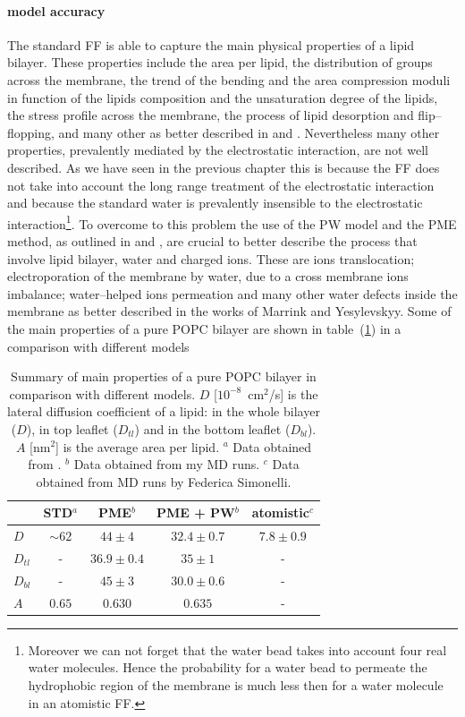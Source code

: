 \paragraph{\textbf{model accuracy}} The standard \martini \ac{FF} is able to capture the main physical properties 
of a lipid bilayer. These properties include the area per lipid, the distribution of groups across the membrane, 
the trend of the bending and the area compression moduli in function of the lipids composition and the 
unsaturation degree of the lipids, the stress profile across the membrane, the process of lipid desorption and 
flip--flopping, and many other as better described in \cite{Martini} and \cite{MartiniReview}. Nevertheless many 
other properties, prevalently mediated by the electrostatic interaction, are not well described. As we have seen 
in the previous chapter this is because the \martini \ac{FF} does not take into account the long range treatment 
of the electrostatic interaction and because the standard \martini water is prevalently insensible to the 
electrostatic interaction\footnote{Moreover we can not forget that the \martini water bead takes into account 
four real water molecules. Hence the probability for a \martini water bead to permeate the hydrophobic region of 
the membrane is much less then for a water molecule in an atomistic \ac{FF}.}. To overcome to this problem the 
use of the \ac{PW} model and the \ac{PME} method, as outlined in \cite{MartiniReview} and \cite{PW}, are crucial 
to better describe the process that involve lipid bilayer, water and charged ions. These are ions translocation; 
electroporation of the membrane by water, due to a cross membrane ions imbalance; water--helped ions permeation 
and many other water defects inside the membrane as better described in the works of Marrink and Yesylevskyy. Some of the main properties of a pure \ac{POPC} bilayer are shown in table~(\ref{tab:POPCData}) in a comparison with different models
\begin{table}[h!t]
	\centering
	\begin{tabular}{lcccc}
		\toprule
		\,				& STD$^a$	& \acs{PME}$^b$	& \acs{PME} + \acs{PW}$^b$ & atomistic$^c$ 	\\ \toprule
		$D$				& $\sim62$	& $44 \pm 4$	& $32.4 \pm 0.7$		& $7.8 \pm 0.9$	\\ \midrule
		$D_{tl}$		& -			& $36.9 \pm 0.4$& $35 \pm 1$			& -				\\ \midrule
		$D_{bl}$		& -			& $45 \pm 3$	& $30.0 \pm 0.6$		& -				\\ \midrule
		$A$				& $0.65$	& $0.630$		& $0.635$				& -				\\ \bottomrule
	\end{tabular}
	\caption{Summary of main properties of a pure \acs{POPC} bilayer in comparison with different models. $D$ [$10^{-8}$~cm$^2$/s] is the lateral diffusion coefficient of a lipid: in the whole bilayer ($D$), in top leaflet ($D_{tl}$) and in the bottom leaflet ($D_{bl}$). $A$ [nm$^2$] is the average area per lipid. \footnotesize $^a$ Data obtained from \cite{Rossi2014}. $^b$ Data obtained from my \ac{MD} runs. $^c$ Data obtained from \ac{MD} runs by Federica Simonelli.}
	\label{tab:POPCData}
\end{table}

